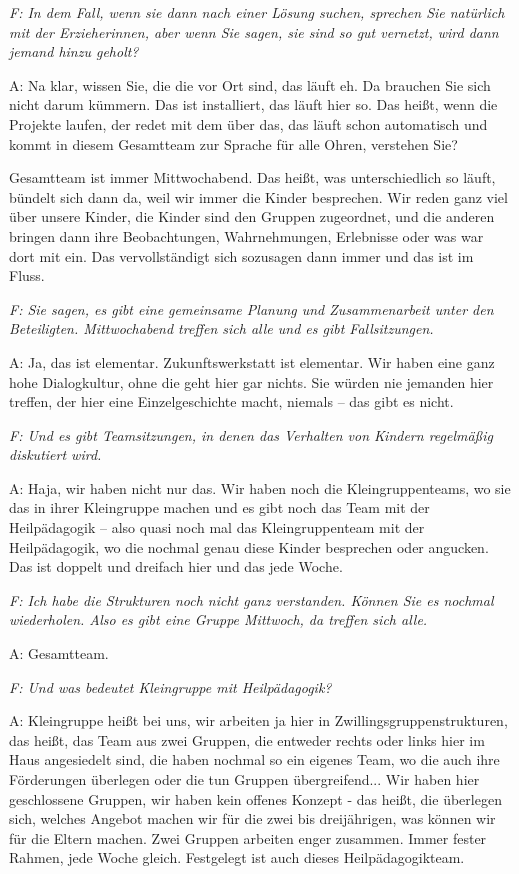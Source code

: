 \begin{linenumbers}
\emph{F: In dem Fall, wenn sie dann nach einer Lösung suchen, sprechen Sie natürlich mit der Erzieherinnen, aber wenn Sie sagen, sie sind so gut vernetzt, wird dann jemand hinzu geholt?}

A: Na klar, wissen Sie, die die vor Ort sind, das läuft eh. Da brauchen Sie sich nicht darum kümmern. Das ist installiert, das läuft hier so. Das heißt, wenn die Projekte laufen, der redet mit dem über das, das läuft schon automatisch und kommt in diesem Gesamtteam zur Sprache für alle Ohren, verstehen Sie?

Gesamtteam ist immer Mittwochabend. Das heißt, was unterschiedlich so läuft, bündelt sich dann da, weil wir immer die Kinder besprechen. Wir reden ganz viel über unsere Kinder, die Kinder sind den Gruppen zugeordnet, und die anderen bringen dann ihre Beobachtungen, Wahrnehmungen, Erlebnisse oder was war dort mit ein. Das vervollständigt sich sozusagen dann immer und das ist im Fluss.

\emph{F: Sie sagen, es gibt eine gemeinsame Planung und Zusammenarbeit unter den Beteiligten. Mittwochabend treffen sich alle und es gibt Fallsitzungen.}

A: Ja, das ist elementar. Zukunftswerkstatt ist elementar. Wir haben eine ganz hohe Dialogkultur, ohne die geht hier gar nichts. Sie würden nie jemanden hier treffen, der hier eine Einzelgeschichte macht, niemals -- das gibt es nicht.

\emph{F: Und es gibt Teamsitzungen, in denen das Verhalten von Kindern regelmäßig diskutiert wird.}

A: Haja, wir haben nicht nur das. Wir haben noch die Kleingruppenteams, wo sie das in ihrer Kleingruppe machen und es gibt noch das Team mit der Heilpädagogik -- also quasi noch mal das Kleingruppenteam mit der Heilpädagogik, wo die nochmal genau diese Kinder besprechen oder angucken. Das ist doppelt und dreifach hier 
und das jede Woche. 

\emph{F: Ich habe die Strukturen noch nicht ganz verstanden. Können Sie es nochmal wiederholen. Also es gibt eine Gruppe Mittwoch, da treffen sich alle.} 

A: Gesamtteam.            

\emph{F: Und was bedeutet Kleingruppe mit Heilpädagogik?}

A: Kleingruppe heißt bei uns, wir arbeiten ja hier in Zwillingsgruppenstrukturen, das heißt, das Team aus zwei Gruppen, die entweder rechts oder links hier im Haus angesiedelt sind, die haben nochmal so ein eigenes Team, wo die auch ihre Förderungen überlegen oder die tun Gruppen übergreifend... Wir haben hier geschlossene Gruppen, wir haben kein offenes Konzept - das heißt, die überlegen sich, welches Angebot machen wir für die zwei bis dreijährigen, was können wir für die Eltern machen. Zwei Gruppen arbeiten enger zusammen. Immer fester Rahmen, jede Woche gleich. Festgelegt ist auch dieses Heilpädagogikteam. 


\end{linenumbers}
